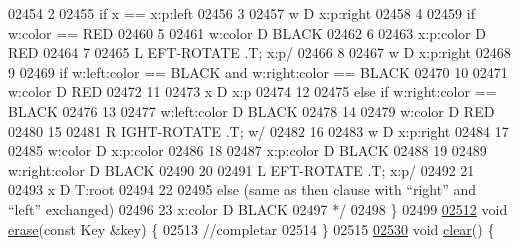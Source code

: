 \begin{DoxyCode}
02454 \textcolor{comment}{        2}
02455 \textcolor{comment}{        if x == x:p:left}
02456 \textcolor{comment}{        3}
02457 \textcolor{comment}{        w D x:p:right}
02458 \textcolor{comment}{        4}
02459 \textcolor{comment}{        if w:color == RED}
02460 \textcolor{comment}{        5}
02461 \textcolor{comment}{        w:color D BLACK}
02462 \textcolor{comment}{        6}
02463 \textcolor{comment}{        x:p:color D RED}
02464 \textcolor{comment}{        7}
02465 \textcolor{comment}{        L EFT-ROTATE .T; x:p/}
02466 \textcolor{comment}{        8}
02467 \textcolor{comment}{        w D x:p:right}
02468 \textcolor{comment}{        9}
02469 \textcolor{comment}{        if w:left:color == BLACK and w:right:color == BLACK}
02470 \textcolor{comment}{        10}
02471 \textcolor{comment}{        w:color D RED}
02472 \textcolor{comment}{        11}
02473 \textcolor{comment}{        x D x:p}
02474 \textcolor{comment}{        12}
02475 \textcolor{comment}{        else if w:right:color == BLACK}
02476 \textcolor{comment}{        13}
02477 \textcolor{comment}{        w:left:color D BLACK}
02478 \textcolor{comment}{        14}
02479 \textcolor{comment}{        w:color D RED}
02480 \textcolor{comment}{        15}
02481 \textcolor{comment}{        R IGHT-ROTATE .T; w/}
02482 \textcolor{comment}{        16}
02483 \textcolor{comment}{        w D x:p:right}
02484 \textcolor{comment}{        17}
02485 \textcolor{comment}{        w:color D x:p:color}
02486 \textcolor{comment}{        18}
02487 \textcolor{comment}{        x:p:color D BLACK}
02488 \textcolor{comment}{        19}
02489 \textcolor{comment}{        w:right:color D BLACK}
02490 \textcolor{comment}{        20}
02491 \textcolor{comment}{        L EFT-ROTATE .T; x:p/}
02492 \textcolor{comment}{        21}
02493 \textcolor{comment}{        x D T:root}
02494 \textcolor{comment}{        22}
02495 \textcolor{comment}{        else (same as then clause with “right” and “left” exchanged)}
02496 \textcolor{comment}{        23 x:color D BLACK}
02497 \textcolor{comment}{*/}
02498             \}
02499 
\hyperlink{classaed2_1_1iterator_a0a0e62b2a2c0fb98f431164c66a6e388_a0a0e62b2a2c0fb98f431164c66a6e388}{02512}                 \textcolor{keywordtype}{void} \hyperlink{classaed2_1_1iterator_a0a0e62b2a2c0fb98f431164c66a6e388_a0a0e62b2a2c0fb98f431164c66a6e388}{erase}(\textcolor{keyword}{const} Key &key) \{
02513                     \textcolor{comment}{//completar}
02514                 \}
02515 
\hyperlink{classaed2_1_1iterator_ac98b533e402839c99d33d3118906c38f_ac98b533e402839c99d33d3118906c38f}{02530}                 \textcolor{keywordtype}{void} \hyperlink{classaed2_1_1iterator_ac98b533e402839c99d33d3118906c38f_ac98b533e402839c99d33d3118906c38f}{clear}() \{

\end{DoxyCode}
